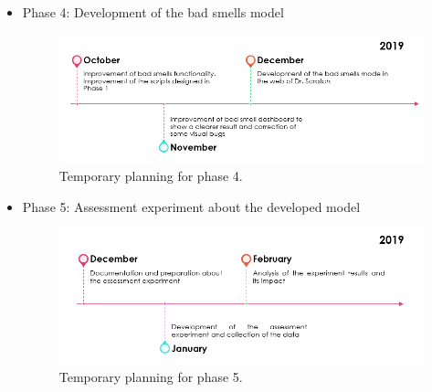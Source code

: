 \begin{itemize}
    \item Phase 4: Development of the bad smells model 
    
    \begin{figure}[h]
    \centering
        \includegraphics[width=11cm, keepaspectratio]{img/phase_4.png}
        \caption{Temporary planning for phase 4.}
        \label{fig:phase_4}
    \end{figure}
    
    \item Phase 5: Assessment experiment about the developed model
    
    \begin{figure}[h]
    \centering
        \includegraphics[width=11cm, keepaspectratio]{img/phase_5.png}
        \caption{Temporary planning for phase 5.}
        \label{fig:phase_5}
    \end{figure}
    
\end{itemize}
